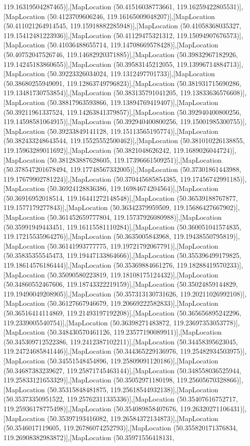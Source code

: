 119.16319504287465)],[MapLocation (50.41516038773661, 119.16259422805531)],[MapLocation (50.4123709606246, 119.16165009048207)],[MapLocation (50.411021264914545, 119.15918882285948)],[MapLocation (50.41058368035327, 119.15412481223936)],[MapLocation (50.41129475321312, 119.15094907676573)],[MapLocation (50.41036488655714, 119.14708669578428)],[MapLocation (50.40752047526746, 119.14682920371885)],[MapLocation (50.39832967182926, 119.14245183860655)],[MapLocation (50.39583145212055, 119.13996714884713)],[MapLocation (50.39223326034024, 119.1312497701733)],[MapLocation (50.38680255949091, 119.12863749796823)],[MapLocation (50.381931715690286, 119.13481730753854)],[MapLocation (50.383135791041205, 119.13833636576608)],[MapLocation (50.38817963593866, 119.13894769419407)],[MapLocation (50.39211961337524, 119.14263841379857)],[MapLocation (50.392940400800256, 119.14598581064915)],[MapLocation (50.392940400800256, 119.15001985300755)],[MapLocation (50.39233849141128, 119.15113565195774)],[MapLocation (50.382433248643544, 119.15525552500462)],[MapLocation (50.381010226138855, 119.15963289011692)],[MapLocation (50.3821048626242, 119.1689026044724)],[MapLocation (50.381283887628605, 119.17396661509251)],[MapLocation (50.378547201678494, 119.17748567332005)],[MapLocation (50.37301861443988, 119.17679902781224)],[MapLocation (50.370445685854385, 119.17456742991185)],[MapLocation (50.36924128836386, 119.16984674204564)],[MapLocation (50.36916952018514, 119.16441272148548)],[MapLocation (50.36539188767877, 119.1577179277843)],[MapLocation (50.36342379959509, 119.15686427667902)],[MapLocation (50.361452659777804, 119.15737926080988)],[MapLocation (50.35991949443451, 119.16115581110284)],[MapLocation (50.360051041574835, 119.17215535964276)],[MapLocation (50.3635005843968, 119.19438550795819)],[MapLocation (50.36141993777775, 119.19721792067791)],[MapLocation (50.35835355545473, 119.19447133864666)],[MapLocation (50.355396499179825, 119.18614576186444)],[MapLocation (50.35369884661276, 119.18288419570233)],[MapLocation (50.35090580223819, 119.18108175124432)],[MapLocation (50.34860552467606, 119.18743322219159)],[MapLocation (50.35024859144829, 119.19490049208905)],[MapLocation (50.357313130731626, 119.20211026992108)],[MapLocation (50.36127667946679, 119.20669222582833)],[MapLocation (50.36516414114869, 119.21493197192208)],[MapLocation (50.365656895242296, 119.2339005540754)],[MapLocation (50.36398271483872, 119.23697353053778)],[MapLocation (50.348430570461126, 119.23577190089911)],[MapLocation (50.345309712522386, 119.2412387102211)],[MapLocation (50.34458395623045, 119.24724685841446)],[MapLocation (50.344365229136976, 119.25482934503975)],[MapLocation (50.34551548454896, 119.25809091120186)],[MapLocation (50.34687383239627, 119.25871745463144)],[MapLocation (50.348558036525944, 119.25833121653329)],[MapLocation (50.35052971180198, 119.25605670328866)],[MapLocation (50.35315848481875, 119.25618544932138)],[MapLocation (50.35373350951522, 119.25762311335336)],[MapLocation (50.35407616752717, 119.25936178775498)],[MapLocation (50.354089858407676, 119.26320271106431)],[MapLocation (50.35397193416082, 119.26584372134873)],[MapLocation (50.3546017119605, 119.26786074252793)],[MapLocation (50.355820171376834, 119.26908382983872)],[MapLocation (50.35971556418131, 